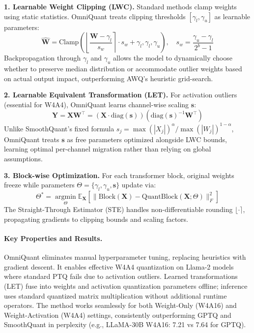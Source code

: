 \textbf{1. Learnable Weight Clipping (LWC).} Standard methods clamp weights using static statistics. OmniQuant treats clipping thresholds $[\gamma_l, \gamma_u]$ as learnable parameters:
\begin{equation}
\hat{\bm{W}} = \text{Clamp}\left(\left\lfloor \frac{\bm{W} - \gamma_l}{s_w} \right\rceil \cdot s_w + \gamma_l, \gamma_l, \gamma_u\right), \quad s_w = \frac{\gamma_u - \gamma_l}{2^b - 1}
\end{equation}
Backpropagation through $\gamma_l$ and $\gamma_u$ allows the model to dynamically choose whether to preserve median distribution or accommodate outlier weights based on actual output impact, outperforming AWQ's heuristic grid-search.

\textbf{2. Learnable Equivalent Transformation (LET).} For activation outliers (essential for W4A4), OmniQuant learns channel-wise scaling $\bm{s}$:
\begin{equation}
\bm{Y} = \bm{X}\bm{W}^\top = (\bm{X} \cdot \text{diag}(\bm{s})) (\text{diag}(\bm{s})^{-1} \bm{W}^\top)
\end{equation}
Unlike SmoothQuant's fixed formula $s_j = \max(|X_j|)^\alpha / \max(|W_j|)^{1-\alpha}$, OmniQuant treats $\bm{s}$ as free parameters optimized alongside LWC bounds, learning optimal per-channel migration rather than relying on global assumptions.

\textbf{3. Block-wise Optimization.} For each transformer block, original weights freeze while parameters $\Theta = \{ \gamma_l, \gamma_u, \bm{s} \}$ update via:
\begin{equation}
\Theta^* = \operatorname*{argmin}_{\Theta} \mathbb{E}_{\bm{X}} \left[ \| \text{Block}(\bm{X}) - \text{QuantBlock}(\bm{X}; \Theta) \|_F^2 \right]
\end{equation}
The Straight-Through Estimator (STE) handles non-differentiable rounding $\lfloor \cdot \rceil$, propagating gradients to clipping bounds and scaling factors.

\paragraph{Key Properties and Results.}
OmniQuant eliminates manual hyperparameter tuning, replacing heuristics with gradient descent. It enables effective W4A4 quantization on Llama-2 models where standard PTQ fails due to activation outliers. Learned transformations (LET) fuse into weights and activation quantization parameters offline; inference uses standard quantized matrix multiplication without additional runtime operators. The method works seamlessly for both Weight-Only (W4A16) and Weight-Activation (W4A4) settings, consistently outperforming GPTQ and SmoothQuant in perplexity (e.g., LLaMA-30B W4A16: 7.21 vs 7.64 for GPTQ).

